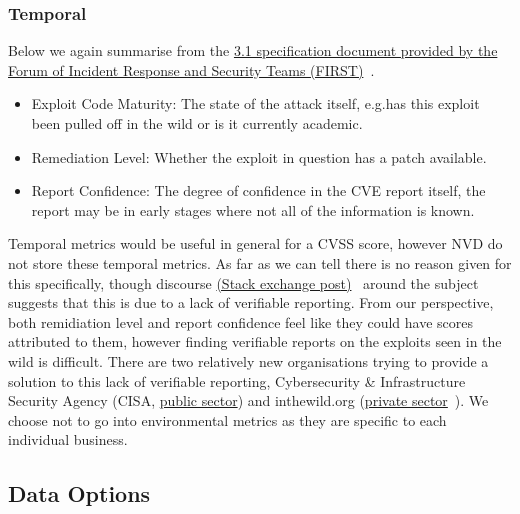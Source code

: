 \documentclass[12pt]{article}
\begin{document}
\subsubsection{Temporal}

Below we again summarise from the
\href{https://www.first.org/cvss/v3.1/specification-document}{3.1 specification document
	provided by the Forum of Incident Response and Security Teams (FIRST)}~\cite{CVSS_31}.

\begin{itemize}

	\item Exploit Code Maturity: The state of the attack itself, e.g.\@ has this exploit been pulled
	      off in the wild or is it currently academic.

	\item Remediation Level: Whether the exploit in question has a patch available.

	\item Report Confidence: The degree of confidence in the CVE report itself, the report may be in
	      early stages where not all of the information is known.

\end{itemize}


\bigskip

Temporal metrics would be useful in general for a CVSS score, however NVD do not store these
temporal metrics. As far as we can tell there is no reason given for this specifically, though
discourse
\href{https://security.stackexchange.com/questions/270257/cvss-v3-and-v3-1-missing-temporal-metrics-exploit-code-maturity-and-remediation}{(Stack exchange post)}~\cite{stack_exchange} around the subject suggests that this is due to a lack
of verifiable reporting. From our perspective, both remidiation level and report confidence feel like
they could have scores attributed to them, however finding verifiable reports on the exploits seen
in the wild is difficult. There are two relatively new organisations trying to provide a solution to
this lack of verifiable reporting,
Cybersecurity \& Infrastructure Security Agency (CISA,
\href{https://www.cisa.gov/known-exploited-vulnerabilities-catalog}{public sector}) and
inthewild.org (\href{https://inthewild.io/}{private sector}~\cite{cisa}). We choose not to go into
environmental metrics as they are specific to each individual business.

\subsection{Data Options}
\end{document}
